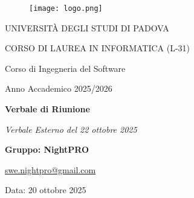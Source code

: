 \documentclass[a4paper, 11pt, oneside]{scrartcl} %
\begin{document}
\thispagestyle{empty}
\begin{titlepage}
    \centering
    
\begin{figure}
    \centering
    \texttt{[image: logo.png]}
\end{figure}

    \vfill
    
    {\small UNIVERSITÀ DEGLI STUDI DI PADOVA \par}
    {\small CORSO DI LAUREA IN INFORMATICA (L-31) \par}
    \vspace{0.5cm}
    {\large Corso di Ingegneria del Software \par}
    {\small Anno Accademico 2025/2026 \par}


    
    \vfill
    
    {\Huge \bfseries Verbale di Riunione \par}
    
    \vspace{1cm}
    
    {\Large \itshape Verbale Esterno del 22 ottobre 2025 \par} 
    
    \vfill
    
    {\Large \bfseries Gruppo: NightPRO \par}
    \vspace{0.5cm}
    {\large \href{mailto:swe.nightpro@gmail.com}{swe.nightpro@gmail.com} \par}
    
    \vfill
    
    {\large Data: 20 ottobre 2025 \par}

\end{titlepage}

\newpage
\tableofcontents %
\pagestyle{fancy} %

\newpage
\end{document}
